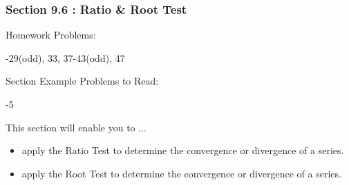 %
%

\begin{frame}
\frametitle{\Large {\color[rgb]{0.02,0.20,1.0} Section 9.6 : Ratio \& Root Test}}
\vspace{0.8cm}
\scriptsize
\begin{block}{Homework Problems:}

\vspace{0.2cm}
-29(odd), 33, 37-43(odd), 47
	
\end{block}
\vspace{0.5cm}

\begin{block}{Section Example Problems to Read:}

\vspace{0.2cm}
-5
	
\end{block}
\vspace{0.2cm}

\begin{block}{This section will enable you to ...}
\begin{itemize}
	\item[...] apply the Ratio Test to determine the convergence or divergence of a series.
	\item[...] apply the Root Test to determine the convergence or divergence of a series.
\end{itemize}
\end{block}
\vspace{3.0cm}
\end{frame}

